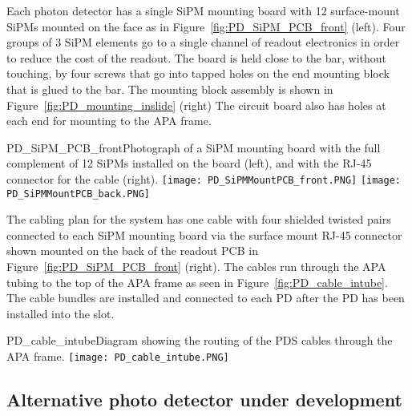 
Each photon detector has a single SiPM mounting board with 12 surface-mount SiPMs 
mounted on the face as in Figure~\ref{fig:PD_SiPM_PCB_front} (left).
Four groups of $3$ SiPM elements go to a single 
channel of readout electronics in order to reduce the cost of the readout.
The board is held close to the bar, without touching, by four screws that go into 
tapped holes on the end mounting block that is glued to the bar.  
The mounting block assembly is shown in Figure~\ref{fig:PD_mounting_inslide} (right) %
The circuit board also has holes at each end for mounting to the APA frame.  

\begin{cdrfigure}
  {PD_SiPM_PCB_front}{Photograph of a SiPM mounting board
    with the full complement of 12 SiPMs installed on the board (left), and with the 
    RJ-45 connector for the cable (right).}
\texttt{[image: PD\_SiPMMountPCB\_front.PNG]}
\texttt{[image: PD\_SiPMMountPCB\_back.PNG]}
\end{cdrfigure}


The cabling plan for the system has one cable with four shielded twisted pairs 
connected to each SiPM mounting board via the surface mount RJ-45 connector
shown mounted on the back of the readout PCB in 
Figure~\ref{fig:PD_SiPM_PCB_front} (right).  
The cables run through the APA tubing to the top of the APA frame as seen
in Figure~\ref{fig:PD_cable_intube}.
The cable bundles are installed and connected to each PD 
after the PD has been installed into the slot.
\begin{cdrfigure}
  {PD_cable_intube}{Diagram showing the routing of the PDS cables
    through the APA frame.}
\texttt{[image: PD\_cable\_intube.PNG]}
\end{cdrfigure}


\subsection{Alternative photo detector under development}


